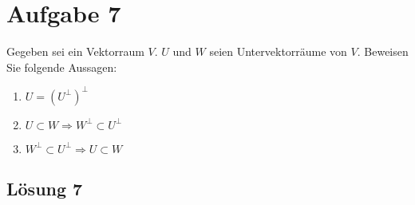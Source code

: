 \documentclass[main.tex]{subfiles}
\begin{document}
\section{Aufgabe 7}
Gegeben sei ein Vektorraum $V$. $U$ und $W$ seien Untervektorräume von $V$. Beweisen Sie folgende Aussagen:

\begin{enumerate}
    \item $U=\left( U^{\perp }\right)^{\perp }$
    \item $U\subset W\Rightarrow W^{\perp } \subset U^{\perp }$
    \item $W^{\perp } \subset U^{\perp } \Rightarrow U\subset W$
\end{enumerate}

\subsection{Lösung 7}
\end{document}
